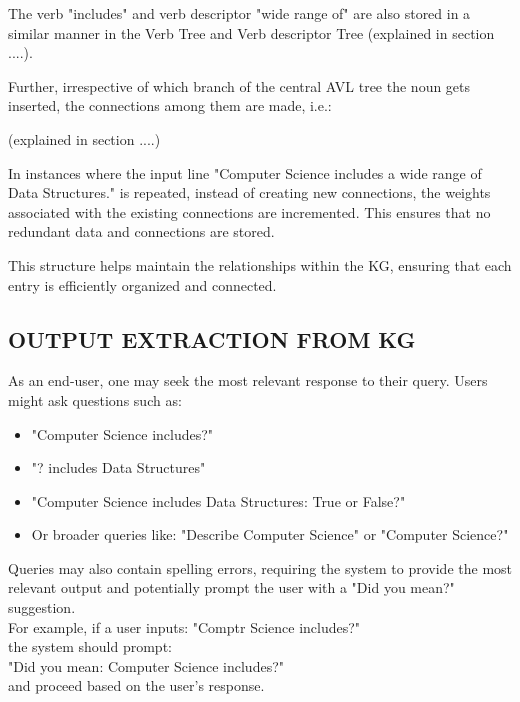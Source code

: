 \documentclass[conference]{IEEEtran}
\begin{document}
The verb "includes" and verb descriptor "wide range of" are also stored in a similar manner
in the Verb Tree and Verb descriptor Tree (explained in section ....).

Further, irrespective of which branch of the central AVL tree the noun gets inserted, 
the connections among them are made, i.e.:


(explained in section ....)

In instances where the input line "Computer Science includes a wide range of Data Structures." is 
repeated, instead of creating new connections, the weights associated with the existing connections 
are incremented. This ensures that no redundant data and connections are stored.

This structure helps maintain the relationships within the KG, 
ensuring that each entry is efficiently organized and connected.


\subsection{OUTPUT EXTRACTION FROM KG}

As an end-user, one may seek the most relevant response to their query. Users might ask questions such as:
\begin{itemize}
    \item "Computer Science includes?"
    \item "? includes Data Structures"
    \item "Computer Science includes Data Structures: True or False?"
    \item Or broader queries like: "Describe Computer Science" or "Computer Science?"
\end{itemize}

Queries may also contain spelling errors, requiring the system to provide the most relevant output and potentially prompt the user with a "Did you mean?" suggestion.
\\
For example, if a user inputs: "Comptr Science includes?" 
\\the system should prompt:
\\
"Did you mean: Computer Science includes?" 
\\
and proceed based on the user's response.
\\
\end{document}
